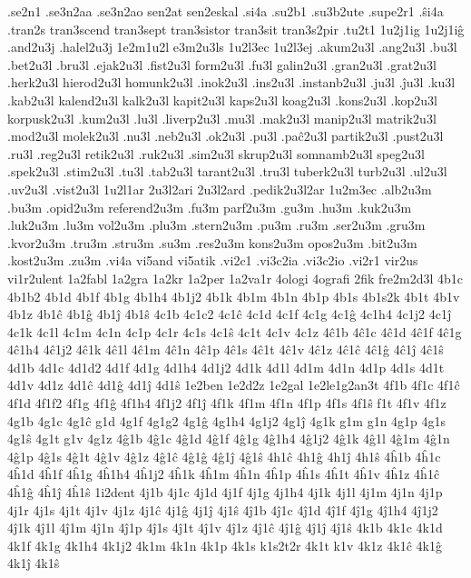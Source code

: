 {%
.se2n1
.se3n2aa .se3n2ao sen2at sen2eskal
.si4a
.su2b1
.su3b2ute
.supe2r1
 
.ŝi4a
.tran2s
tran3scend tran3sept  tran3sistor  tran3sit  tran3s2pir
.tu2t1
 1u2j1ig 1u2j1iĝ
.and2u3j .halel2u3j
 1e2m1u2l e3m2u3ls 1u2l3ec 1u2l3ej
%
.akum2u3l .ang2u3l .bu3l .bet2u3l .bru3l .ejak2u3l .fist2u3l
form2u3l .fu3l galin2u3l .gran2u3l .grat2u3l .herk2u3l
hierod2u3l homunk2u3l .inok2u3l .ins2u3l .instanb2u3l .ju3l .ĵu3l
.ku3l .kab2u3l kalend2u3l kalk2u3l kapit2u3l kaps2u3l koag2u3l
.kons2u3l .kop2u3l korpusk2u3l .kum2u3l .lu3l .liverp2u3l .mu3l
.mak2u3l manip2u3l matrik2u3l .mod2u3l molek2u3l .nu3l .neb2u3l
.ok2u3l .pu3l .paĉ2u3l partik2u3l .pust2u3l .ru3l
.reg2u3l retik2u3l .ruk2u3l .sim2u3l skrup2u3l somnamb2u3l speg2u3l
.spek2u3l .stim2u3l .tu3l .tab2u3l tarant2u3l .tru3l tuberk2u3l
turb2u3l .ul2u3l .uv2u3l .vist2u3l
%
1u2l1ar 2u3l2ari 2u3l2ard .pedik2u3l2ar
  1u2m3ec
.alb2u3m .bu3m .opid2u3m referend2u3m .fu3m parf2u3m .gu3m
.hu3m .kuk2u3m .luk2u3m .lu3m vol2u3m .plu3m .stern2u3m
.pu3m .ru3m .ser2u3m .gru3m .kvor2u3m .tru3m .stru3m
.su3m .res2u3m kons2u3m opos2u3m .bit2u3m .kost2u3m .zu3m
.vi4a
vi5and vi5atik
.vi2c1
.vi3c2ia .vi3c2io
.vi2r1
vir2us vi1r2ulent
1a2fabl 1a2gra 1a2kr 1a2per 1a2va1r
4ologi 4ografi 2fik
fre2m2d3l
%
4b1c 4b1b2 4b1d 4b1f 4b1g 4b1h4 4b1j2 4b1k 4b1m 4b1n 4b1p 4b1s 4b1s2k 4b1t 4b1v
4b1z 4b1ĉ 4b1ĝ 4b1ĵ 4b1ŝ
4c1b 4c1c2 4c1ĉ 4c1d 4c1f 4c1g 4c1ĝ 4c1h4 4c1j2 4c1ĵ 4c1k 4c1l 4c1m 4c1n
4c1p 4c1r 4c1s 4c1ŝ 4c1t 4c1v 4c1z
%
4ĉ1b 4ĉ1c 4ĉ1d 4ĉ1f 4ĉ1g 4ĉ1h4 4ĉ1j2 4ĉ1k 4ĉ1l 4ĉ1m 4ĉ1n 4ĉ1p
4ĉ1s 4ĉ1t 4ĉ1v 4ĉ1z 4ĉ1ĉ 4ĉ1ĝ 4ĉ1ĵ 4ĉ1ŝ
%
4d1b 4d1c 4d1d2 4d1f 4d1g 4d1h4 4d1j2 4d1k 4d1l 4d1m 4d1n 4d1p 4d1s 4d1t 4d1v
4d1z 4d1ĉ 4d1ĝ 4d1ĵ 4d1ŝ
%
1e2ben 1e2d2z 1e2gal 1e2le1g2an3t
%
4f1b 4f1c 4f1ĉ 4f1d 4f1f2 4f1g 4f1ĝ 4f1h4 4f1j2 4f1ĵ 4f1k 4f1m 4f1n 4f1p
4f1s 4f1ŝ f1t 4f1v 4f1z
4g1b 4g1c 4g1ĉ g1d 4g1f 4g1g2 4g1ĝ 4g1h4 4g1j2 4g1ĵ 4g1k g1m g1n 4g1p
4g1s 4g1ŝ 4g1t g1v 4g1z
%
4ĝ1b 4ĝ1c 4ĝ1d 4ĝ1f 4ĝ1g 4ĝ1h4 4ĝ1j2 4ĝ1k 4ĝ1l 4ĝ1m 4ĝ1n 4ĝ1p
4ĝ1s 4ĝ1t 4ĝ1v 4ĝ1z 4ĝ1ĉ 4ĝ1ĝ 4ĝ1ĵ 4ĝ1ŝ
%
4h1ĉ 4h1ĝ 4h1ĵ 4h1ŝ
%
4ĥ1b 4ĥ1c 4ĥ1d 4ĥ1f 4ĥ1g 4ĥ1h4 4ĥ1j2 4ĥ1k 4ĥ1m 4ĥ1n 4ĥ1p
4ĥ1s 4ĥ1t 4ĥ1v 4ĥ1z 4ĥ1ĉ 4ĥ1ĝ 4ĥ1ĵ 4ĥ1ŝ
%
1i2dent
%
4j1b 4j1c 4j1d 4j1f 4j1g 4j1h4 4j1k 4j1l 4j1m 4j1n 4j1p 4j1r 4j1s
4j1t 4j1v 4j1z 4j1ĉ 4j1ĝ 4j1ĵ 4j1ŝ
%
4ĵ1b 4ĵ1c 4ĵ1d 4ĵ1f 4ĵ1g 4ĵ1h4 4ĵ1j2 4ĵ1k 4ĵ1l 4ĵ1m 4ĵ1n 4ĵ1p
4ĵ1s 4ĵ1t 4ĵ1v 4ĵ1z 4ĵ1ĉ 4ĵ1ĝ 4ĵ1ĵ 4ĵ1ŝ
%
4k1b 4k1c 4k1d 4k1f 4k1g 4k1h4 4k1j2 4k1m 4k1n 4k1p 4k1s
k1s2t2r
4k1t k1v 4k1z 4k1ĉ 4k1ĝ 4k1ĵ 4k1ŝ
}
